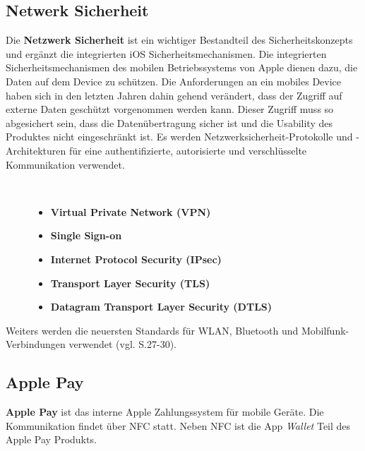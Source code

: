 \subsection{Netwerk Sicherheit}
\label{sec:NetworkSec}
Die \textbf{ Netzwerk Sicherheit} ist ein wichtiger Bestandteil des Sicherheitskonzepts und ergänzt die integrierten iOS Sicherheitsmechanismen. Die integrierten Sicherheitsmechanismen des mobilen Betriebssystems von Apple dienen dazu, die Daten auf dem Device zu schützen. Die Anforderungen an ein mobiles Device haben sich in den letzten Jahren dahin gehend verändert, dass der Zugriff auf externe Daten geschützt vorgenommen werden kann. Dieser Zugriff muss so abgesichert sein, dass die Datenübertragung sicher ist und die Usability des Produktes nicht eingeschränkt ist. Es werden Netzwerksicherheit-Protokolle und -Architekturen für eine authentifizierte, autorisierte und verschlüsselte Kommunikation verwendet.
\begin{description}
\item[\parbox{\textwidth} {Ein iOS Device verfügt über folgende Netzwerksicherheit-Protokolle und -Architekturen
an}]~\par
	\begin{itemize}
		\item \textbf{Virtual Private Network (VPN)}
 		\item \textbf{Single Sign-on}
 		\item \textbf{Internet Protocol Security (IPsec)}
 		\item \textbf{Transport Layer Security (TLS)} %
		\item \textbf{Datagram Transport Layer Security (DTLS)}
        \end{itemize}
\end{description}
Weiters werden die neuersten Standards für WLAN, Bluetooth und Mobilfunk-Verbindungen verwendet (vgl. \cite{Apple[4]} S.27-30).

\subsection{Apple Pay}
\label{sec:ApplePay}

\textbf{Apple Pay} ist das interne Apple Zahlungssystem für mobile Geräte. Die Kommunikation findet über NFC statt. Neben NFC ist die App \textit{\glqq Wallet\grqq{}} Teil des Apple Pay Produkts.

